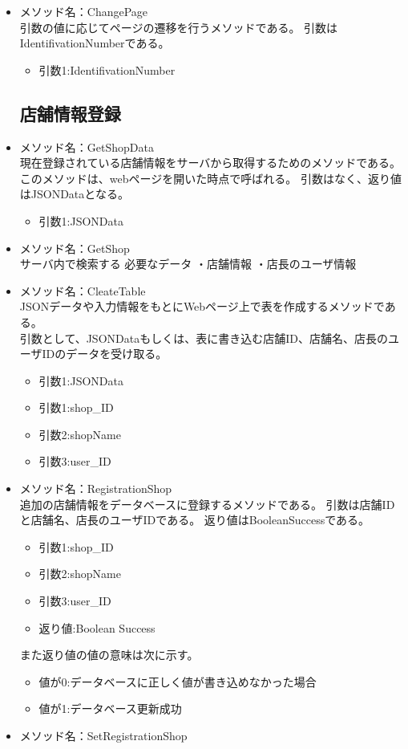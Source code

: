 \documentclass[a4j]{jarticle}
\begin{document}
\begin{itemize}
\item メソッド名：ChangePage\\

引数の値に応じてページの遷移を行うメソッドである。
引数はIdentifivationNumberである。

	\begin{itemize}
		\item 引数1:IdentifivationNumber
	\end{itemize}
\subsection{店舗情報登録}
%
\item メソッド名：GetShopData\\

現在登録されている店舗情報をサーバから取得するためのメソッドである。このメソッドは、webページを開いた時点で呼ばれる。
引数はなく、返り値はJSONDataとなる。
	\begin{itemize}
		\item 引数1:JSONData
	\end{itemize}
\item メソッド名：GetShop\\

サーバ内で検索する
必要なデータ
・店舗情報
・店長のユーザ情報

\item メソッド名：CleateTable\\
JSONデータや入力情報をもとにWebページ上で表を作成するメソッドである。\\
引数として、JSONDataもしくは、表に書き込む店舗ID、店舗名、店長のユーザIDのデータを受け取る。
	\begin{itemize}
		\item 引数1:JSONData
		
		
		\item 引数1:shop\_ID
		\item 引数2:shopName
		\item 引数3:user\_ID
	\end{itemize}
\item メソッド名：RegistrationShop\\

追加の店舗情報をデータベースに登録するメソッドである。
引数は店舗IDと店舗名、店長のユーザIDである。
返り値はBooleanSuccessである。
	\begin{itemize}
		\item 引数1:shop\_ID
		\item 引数2:shopName
		\item 引数3:user\_ID
		\item 返り値:Boolean Success
	\end{itemize}
また返り値の値の意味は次に示す。
	\begin{itemize}
		\item 値が0:データベースに正しく値が書き込めなかった場合
		\item 値が1:データベース更新成功
	\end{itemize}
\item メソッド名：SetRegistrationShop\\



\end{itemize}
\end{document}
